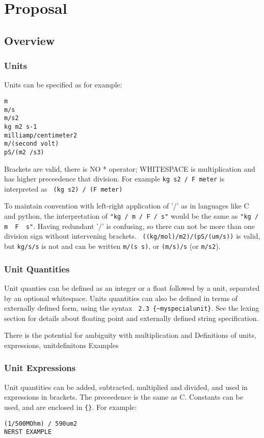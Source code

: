 \documentclass{article}
\begin{document}
\newpage
\section{Proposal}

\subsection{Overview}
\subsubsection*{Units}
Units can be specified as for example:
\begin{verbatim}
m
m/s 
m/s2 
kg m2 s-1
milliamp/centimeter2
m/(second volt) 
pS/(m2 /s3)
\end{verbatim}

Brackets are valid, there is NO * operator; WHITESPACE is multiplication and has higher preceedence that division. For example
\verb|kg s2 / F meter| is interpreted as \verb| (kg s2) / (F meter)|

To maintain convention with left-right  application of '/' as in languages like C and python, the interpretation of  \verb|"kg / m / F / s"| would be the same as \verb|"kg / m  F  s"|. Having redundant '/' is confusing, so there can not be more than one division sign without intervening brackets.
\verb| ((kg/mol)/m2)/(pS/(um/s))| is valid, but \verb|kg/s/s| is not and can be written \verb|m/(s s)|, or \verb|(m/s)/s| (or \verb|m/s2|).


\subsubsection*{Unit Quantities}

Unit quanties can be defined as an integer or a float followed by a unit, separated by an optional whitespace. 
Units quantities can also be defined in terms of externally defined form, using the syntax
\verb| 2.3 {~myspecialunit}|.  See the lexing section for details about floating point and externally defined string specification.



There is the potential for ambiguity with multiplication and 
Definitions of units, expressions, unitdefinitons
Examples

\subsubsection*{Unit Expressions}
Unit quantities can be added, subtracted, multiplied and divided, and used in expressions in brackets. The preceedence is the same as C.
Constants can be used, and are enclosed in \verb|{}|.
For example:
\begin{verbatim}
(1/500MOhm) / 590um2
NERST EXAMPLE
\end{verbatim}
\end{document}
